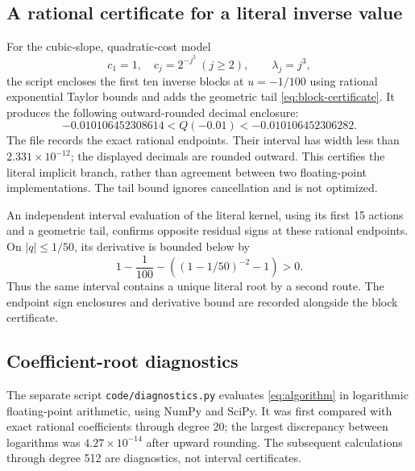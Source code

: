 \documentclass[11pt,a4paper]{article}
\numberwithin{equation}{section}
\theoremstyle{definition}
\theoremstyle{remark}
\theoremstyle{definition}
\begin{document}
\subsection{A rational certificate for a literal inverse value}
For the cubic-slope, quadratic-cost model
\[
 c_1=1,\quad c_j=2^{-j^2}\ (j\ge2),\qquad \lambda_j=j^3,
\]
the script encloses the first ten inverse blocks at $u=-1/100$ using
rational exponential Taylor bounds and adds the geometric tail
\eqref{eq:block-certificate}. It produces the following outward-rounded
decimal enclosure:
\begin{equation}
 -0.010106452308614
 < Q(-0.01) <
 -0.010106452306282.
 \label{eq:certificate-value}
\end{equation}
The file  records the exact rational
endpoints. Their interval has width less than $2.331\times10^{-12}$;
the displayed decimals are rounded outward. This certifies the literal
implicit branch, rather than agreement between two floating-point
implementations. The tail bound ignores cancellation and is not optimized.

An independent interval evaluation of the literal kernel, using its first
15 actions and a geometric tail, confirms opposite residual signs at
these rational endpoints. On $|q|\le1/50$, its derivative is bounded below by
\[
 1-\frac1{100}-\left((1-1/50)^{-2}-1\right)>0.
\]
Thus the same interval contains a unique literal root by a second route.
The endpoint sign enclosures and derivative bound are recorded alongside
the block certificate.


\subsection{Coefficient-root diagnostics}
The separate script \texttt{code/diagnostics.py} evaluates
\eqref{eq:algorithm} in logarithmic floating-point arithmetic, using
NumPy and SciPy. It was first compared with exact rational coefficients
through degree 20; the largest discrepancy between logarithms was
$4.27\times10^{-14}$ after upward rounding. The subsequent calculations
through degree 512 are diagnostics, not interval certificates.
\end{document}
